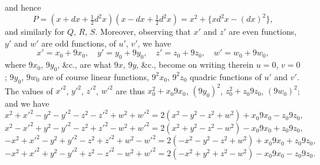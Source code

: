 \documentclass[11pt,a4paper]{book}
\begin{document}
\newpage
\setcounter{page}{558}

\noindent
and hence
\[
P = (x + dx + \tfrac12 d^2x)(x - dx + \tfrac12 d^2x) = x^2 + \{xd^2x - (dx)^2\},
\]
and similarly for $Q$, $R$, $S$. Moreover, observing that $x'$ and $z'$ are even functions, $y'$ and $w'$ are odd functions, of $u'$, $v'$, we have
\[
x' = x_0 + 9x_0,\quad y' = y_0 + 9y_0,\quad z' = z_0 + 9z_0,\quad w' = w_0 + 9w_0,
\]
where $9x_0$, $9y_0$, \&c., are what $9x$, $9y$, \&c., become on writing therein $u=0$, $v=0$; $9y_0$, $9w_0$ are of course linear functions, $9^2x_0$, $9^2z_0$ quadric functions of $u'$ and $v'$. The values of $x'^2$, $y'^2$, $z'^2$, $w'^2$ are thus $x_0^2 + x_0 9x_0$, $(9y_0)^2$, $z_0^2 + z_0 9z_0$, $(9w_0)^2$; and we have
\[
x^2 + x'^2 - y^2 - y'^2 - z^2 - z'^2 + w^2 + w'^2 = 2(x^2 - y^2 - z^2 + w^2) + x_0 9x_0 - z_0 9z_0,
\]
\[
x^2 - x'^2 + y^2 - y'^2 - z^2 + z'^2 - w^2 + w'^2 = 2(x^2 + y^2 - z^2 - w^2) - x_0 9x_0 + z_0 9z_0,
\]
\[
-x^2 + x'^2 - y^2 + y'^2 - z^2 + z'^2 + w^2 - w'^2 = 2(-x^2 - y^2 - z^2 + w^2) + x_0 9x_0 + z_0 9z_0,
\]
\[
-x^2 + x'^2 + y^2 - y'^2 + z^2 - z'^2 - w^2 + w'^2 = 2(-x^2 + y^2 + z^2 - w^2) - x_0 9x_0 - z_0 9z_0.
\]

\newpage
\setcounter{page}{559}
\end{document}
